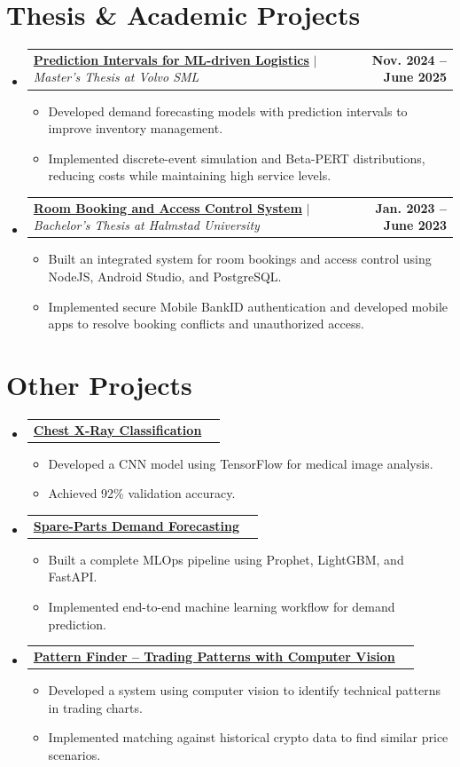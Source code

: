 \documentclass[10pt,a4paper]{article}
\makeatletter
\newcommand{\resumeItem}[1]{
  \item\small{
    {#1 \vspace{-2pt}}
  }
}
\newcommand{\resumeProjectHeading}[2]{
    \vspace{3pt}\item
    \begin{tabular*}{1.0\textwidth}{l@{\extracolsep{\fill}}r}
      \small#1 & \textbf{\small #2} \\
    \end{tabular*}\vspace{-3pt}
}
\newcommand{\resumeSubHeadingListStart}{\begin{itemize}[leftmargin=0.0in, label={}]}
\newcommand{\resumeSubHeadingListEnd}{\end{itemize}}
\newcommand{\resumeItemListStart}{\begin{itemize}[leftmargin=0.15in]}
\newcommand{\resumeItemListEnd}{\end{itemize}\vspace{1pt}}
\makeatother
\begin{document}
\section{Thesis \& Academic Projects}
    \resumeSubHeadingListStart
      \resumeProjectHeading
          {\href{https://urn.kb.se/resolve?urn=urn:nbn:se:hh:diva-57027}{\textbf{Prediction Intervals for ML-driven Logistics}} $|$ \emph{Master's Thesis at Volvo SML}}{Nov. 2024 -- June 2025}
          \resumeItemListStart
            \resumeItem{Developed demand forecasting models with prediction intervals to improve inventory management.}
            \resumeItem{Implemented discrete-event simulation and Beta-PERT distributions, reducing costs while maintaining high service levels.}
          \resumeItemListEnd
      \resumeProjectHeading
          {\href{https://urn.kb.se/resolve?urn=urn:nbn:se:hh:diva-51061}{\textbf{Room Booking and Access Control System}} $|$ \emph{Bachelor's Thesis at Halmstad University}}{Jan. 2023 -- June 2023}
          \resumeItemListStart
            \resumeItem{Built an integrated system for room bookings and access control using NodeJS, Android Studio, and PostgreSQL.}
            \resumeItem{Implemented secure Mobile BankID authentication and developed mobile apps to resolve booking conflicts and unauthorized access.}
          \resumeItemListEnd
    \resumeSubHeadingListEnd

\section{Other Projects}
    \resumeSubHeadingListStart
      \resumeProjectHeading
          {\href{https://github.com/ham0di01/chest-xray-classification}{\textbf{Chest X-Ray Classification}}}{}
          \resumeItemListStart
            \resumeItem{Developed a CNN model using TensorFlow for medical image analysis.}
            \resumeItem{Achieved 92\% validation accuracy.}
          \resumeItemListEnd
      \resumeProjectHeading
          {\href{https://github.com/ham0di01/mlops-forecasting-service}{\textbf{Spare-Parts Demand Forecasting}}}{}
          \resumeItemListStart
            \resumeItem{Built a complete MLOps pipeline using Prophet, LightGBM, and FastAPI.}
            \resumeItem{Implemented end-to-end machine learning workflow for demand prediction.}
          \resumeItemListEnd
      \resumeProjectHeading
          {\href{https://github.com/ham0di01/pattern-finder}{\textbf{Pattern Finder -- Trading Patterns with Computer Vision}}}{}
          \resumeItemListStart
            \resumeItem{Developed a system using computer vision to identify technical patterns in trading charts.}
            \resumeItem{Implemented matching against historical crypto data to find similar price scenarios.}
          \resumeItemListEnd
    \resumeSubHeadingListEnd
\end{document}
